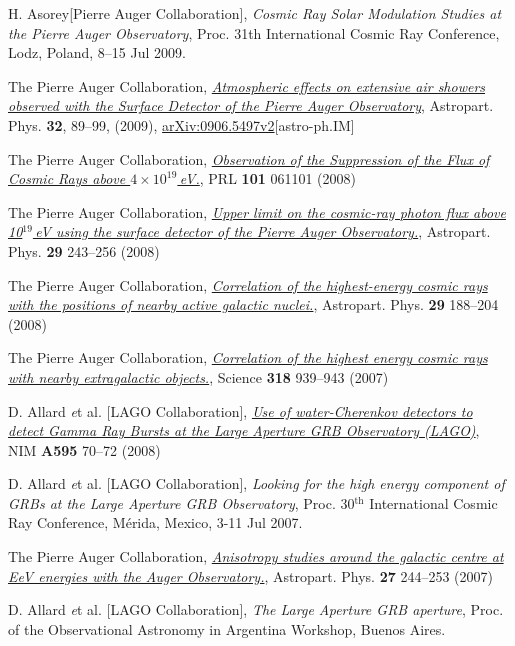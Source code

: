 \begin{etaremune}
\item {}H. Asorey[Pierre Auger Collaboration], {\emph{Cosmic Ray Solar
Modulation Studies at the Pierre Auger Observatory}}, \en Proc. 31th
International Cosmic Ray Conference, Lodz, Poland, 8--15 Jul 2009.

\item {} The Pierre Auger Collaboration,
\href{http://dx.doi.org/10.1016/j.astropartphys.2009.06.004}{\emph{Atmospheric
effects on extensive air showers observed with the Surface Detector of the
Pierre Auger Observatory}}, Astropart. Phys. {\bf 32}, 89--99, (2009),
\href{http://arxiv.org/abs/0906.5497/}{arXiv:0906.5497v2}[astro-ph.IM]

\item {}The Pierre Auger Collaboration,
\href{http://dx.doi.org/10.1103/PhysRevLett.101.061101}{\emph{Observation of
the Suppression of the Flux of Cosmic Rays above $4\times10^{19}$\,eV.}}, PRL
{\bf 101} 061101 (2008)

\item {}The Pierre Auger Collaboration,
\href{http://dx.doi.org/10.1016/j.astropartphys.2008.01.003}{\emph{Upper limit
on the cosmic-ray photon flux above 10$^{19}$\,eV using the surface detector of
the Pierre Auger Observatory.}}, Astropart. Phys. {\bf 29} 243--256 (2008)

\item {}The Pierre Auger Collaboration,
\href{http://dx.doi.org/10.1016/j.astropartphys.2008.01.002}{\emph{Correlation
of the highest-energy cosmic rays with the positions of nearby active galactic
nuclei.}}, Astropart. Phys. {\bf 29} 188--204 (2008)

\item {}The Pierre Auger Collaboration,
\href{http://dx.doi.org/10.1126/science.1151124}{\emph{Correlation of the
highest energy cosmic rays with nearby extragalactic objects.}}, Science {\bf
318} 939--943 (2007)

\item {}D. Allard {\emph et al.} [LAGO Collaboration],
\href{http://dx.doi.org/10.1016/j.nima.2008.07.041}{\emph{Use of
water-Cherenkov detectors to detect Gamma Ray Bursts at the Large Aperture GRB
Observatory (LAGO)}}, NIM {\bf A595} 70--72 (2008)

\item {}D. Allard {\emph et al.} [LAGO Collaboration], {\emph{Looking for
the high energy component of GRBs at the Large Aperture GRB Observatory}}, \en
Proc. 30$^{\mathrm{th}}$ International Cosmic Ray Conference,  Mérida, Mexico, 3-11 Jul
2007.

\item {}The Pierre Auger Collaboration,
\href{http://dx.doi.org/10.1016/j.astropartphys.2006.11.002}{\emph{Anisotropy
studies around the galactic centre at EeV energies with the Auger
Observatory.}},  Astropart. Phys. {\bf 27} 244--253 (2007)

\item {}D. Allard {\emph et al.} [LAGO Collaboration], {\emph{The Large
Aperture GRB aperture}}, \en Proc. of the Observational Astronomy in Argentina
Workshop, Buenos Aires.

\end{etaremune}
